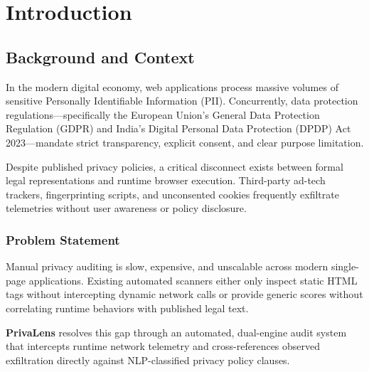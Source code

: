 \documentclass[12pt, a4paper, oneside]{report}
\begin{document}
\chapter{Introduction}

\section{Background and Context}
In the modern digital economy, web applications process massive volumes of sensitive Personally Identifiable Information (PII). Concurrently, data protection regulations---specifically the European Union's General Data Protection Regulation (GDPR) and India's Digital Personal Data Protection (DPDP) Act 2023---mandate strict transparency, explicit consent, and clear purpose limitation.

Despite published privacy policies, a critical disconnect exists between formal legal representations and runtime browser execution. Third-party ad-tech trackers, fingerprinting scripts, and unconsented cookies frequently exfiltrate telemetries without user awareness or policy disclosure.

\subsection{Problem Statement}
Manual privacy auditing is slow, expensive, and unscalable across modern single-page applications. Existing automated scanners either only inspect static HTML tags without intercepting dynamic network calls or provide generic scores without correlating runtime behaviors with published legal text. 

\textbf{PrivaLens} resolves this gap through an automated, dual-engine audit system that intercepts runtime network telemetry and cross-references observed exfiltration directly against NLP-classified privacy policy clauses.
\end{document}
